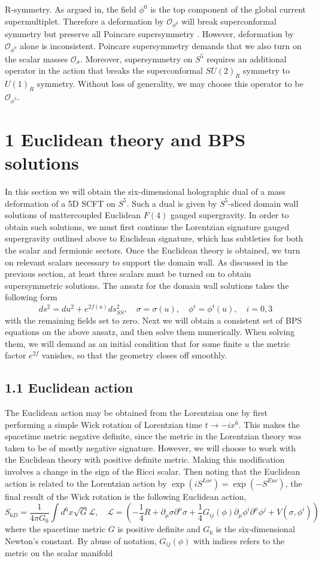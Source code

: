 \documentclass{article}
\begin{document}
R-symmetry. As argued in, the field \(\phi^{0}\) is the top component of the global current supermultiplet. Therefore a deformation by \(\mathcal{O}_{\phi^{0}}\) will break superconformal symmetry but preserve all Poincare supersymmetry . However, deformation by \(\mathcal{O}_{\phi^{0}}\) alone is inconsistent. Poincare supersymmetry demands that we also turn on the scalar masses \(\mathcal{O}_{\sigma}\). Moreover, supersymmetry on \(S^{5}\) requires an additional operator in the action that breaks the superconformal \(S U(2)_{R}\) symmetry to \(U(1)_{R}\) symmetry. Without loss of generality, we may choose this operator to be \(\mathcal{O}_{\phi^{3}}\).
\section*{1 Euclidean theory and BPS solutions}
In this section we will obtain the six-dimensional holographic dual of a mass deformation of a 5D SCFT on \(S^{5}\). Such a dual is given by \(S^{5}\)-sliced domain wall solutions of mattercoupled Euclidean \(F(4)\) gauged supergravity. In order to obtain such solutions, we must first continue the Lorentzian signature gauged supergravity outlined above to Euclidean signature, which has subtleties for both the scalar and fermionic sectors. Once the Euclidean theory is obtained, we turn on relevant scalars necessary to support the domain wall. As discussed in the previous section, at least three scalars must be turned on to obtain supersymmetric solutions. The ansatz for the domain wall solutions takes the following form
\[
d s^{2}=d u^{2}+e^{2 f(u)} d s_{S S}^{2}, \quad \sigma=\sigma(u), \quad \phi^{i}=\phi^{i}(u), \quad i=0,3
\]
with the remaining fields set to zero. Next we will obtain a consistent set of BPS equations on the above ansatz, and then solve them numerically. When solving them, we will demand as an initial condition that for some finite \(u\) the metric factor \(e^{2 f}\) vanishes, so that the geometry closes off smoothly.
\subsection*{1.1 Euclidean action}
The Euclidean action may be obtained from the Lorentzian one by first performing a simple Wick rotation of Lorentzian time \(t \rightarrow-i x^{6}\). This makes the spacetime metric negative definite, since the metric in the Lorentzian theory was taken to be of mostly negative signature. However, we will choose to work with the Euclidean theory with positive definite metric. Making this modification involves a change in the sign of the Ricci scalar. Then noting that the Euclidean action is related to the Lorentzian action by \(\exp \left(i S^{L o r}\right)=\exp \left(-S^{E u c}\right)\), the final result of the Wick rotation is the following Euclidean action,
\[
S_{6 D}=\frac{1}{4 \pi G_{6}} \int d^{6} x \sqrt{G} \mathcal{L}, \quad \mathcal{L}=\left(-\frac{1}{4} R+\partial_{\mu} \sigma \partial^{\mu} \sigma+\frac{1}{4} G_{i j}(\phi) \partial_{\mu} \phi^{i} \partial^{\mu} \phi^{j}+V\left(\sigma, \phi^{i}\right)\right)
\]
where the spacetime metric \(G\) is positive definite and \(G_{6}\) is the six-dimensional Newton's constant. By abuse of notation, \(G_{i j}(\phi)\) with indices refers to the metric on the scalar manifold
\end{document}
